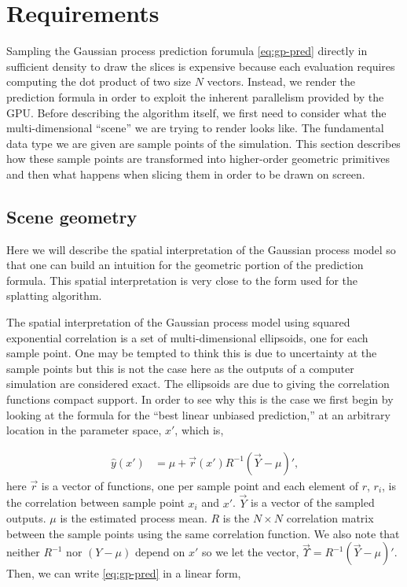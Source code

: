 \section{Requirements}
\label{sec:requirements}

Sampling the Gaussian process prediction forumula \autoref{eq:gp-pred} directly in
sufficient density to draw the slices is expensive because each evaluation
requires computing the dot product of two size $N$ vectors.  Instead, we render
the prediction formula in order to exploit the inherent parallelism provided by
the GPU. Before describing the algorithm itself, we first need to consider
what the multi-dimensional ``scene'' we are trying to render looks like.  The
fundamental data type we are given are sample points of the simulation.  This
section describes how these sample points are transformed into higher-order
geometric primitives and then what happens when slicing them in order to be
drawn on screen.

\subsection{Scene geometry}
\label{sec:scene_geometry}

Here we will describe the spatial interpretation of the Gaussian process
model so that one can build an intuition for the geometric portion of the 
prediction formula.  This spatial interpretation is very close to the 
form used for the splatting algorithm.

The spatial interpretation of the Gaussian process model using squared 
exponential correlation is a set of 
multi-dimensional ellipsoids, one for each sample point. 
One may be tempted to think this is due to uncertainty at the sample points
but this is not the case here as the outputs of a computer simulation are
considered exact. The ellipsoids are due to giving the correlation functions
compact support.
In order to see
why this is the case we first begin by looking at the formula for the 
``best linear unbiased prediction,''
at an arbitrary location
in the parameter space, $x'$, which is,

\begin{align}
  \hat{y}(x') &= \mu + \vec{r}(x') R^{-1} (\vec{Y} - \mu)' \text{,}
  \label{eq:gp-pred}
\end{align}
here $\vec{r}$ is a vector of functions, one per sample point
and each element of $r$, $r_i$, is the correlation 
between
sample point $x_i$ and $x'$.  
$\vec{Y}$ is a vector of the sampled outputs.
$\mu$ is the estimated process mean.
$R$ is 
the $N \times N$ correlation matrix 
between the sample points using the same correlation function.
We also note that neither $R^{-1}$ nor $(Y - \mu)$
depend on $x'$ so we let the vector, 
$\vec{\Upsilon} = R^{-1} (\vec{Y} - \mu)'$.  
Then, we can write \autoref{eq:gp-pred} in a linear form,

